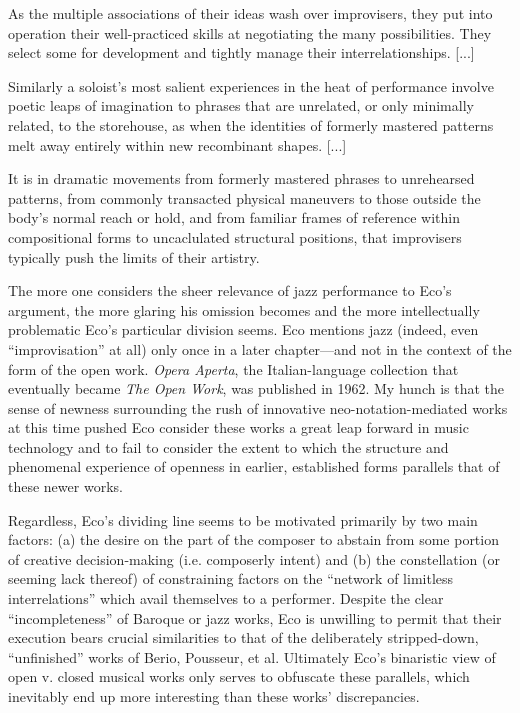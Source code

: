         \begin{smallquote}
            As the multiple associations of their ideas wash over improvisers, they put into operation their well-practiced skills at negotiating the many possibilities. They select some for development and tightly manage their interrelationships. [...]

                \vspace{5pt}

            \noindent Similarly a soloist's most salient experiences in the heat of performance involve poetic leaps of imagination to phrases that are unrelated, or only minimally related, to the storehouse, as when the identities of formerly mastered patterns melt away entirely within new recombinant shapes. [...]

                \vspace{5pt}
            
            \noindent It is in dramatic movements from formerly mastered phrases to unrehearsed patterns, from commonly transacted physical maneuvers to those outside the body's normal reach or hold, and from familiar frames of reference within compositional forms to uncaclulated structural positions, that improvisers typically push the limits of their artistry.\autocite[216--7]{Berliner_1994}
        \end{smallquote}

    The more one considers the sheer relevance of jazz performance to Eco's argument, the more glaring his omission becomes and the more intellectually problematic Eco's particular division seems. Eco mentions jazz (indeed, even ``improvisation'' at all) only once in a later chapter---and not in the context of the form of the open work.\autocite[109]{Eco_Robey_1989} \textit{Opera Aperta}, the Italian-language collection that eventually became \textit{The Open Work}, was published in 1962. My hunch is that the sense of newness surrounding the rush of innovative neo-notation-mediated works at this time pushed Eco consider these works a great leap forward in music technology and to fail to consider the extent to which the structure and phenomenal experience of openness in earlier, established forms parallels that of these newer works. 
    
    Regardless, Eco's dividing line seems to be motivated primarily by two main factors: (a) the desire on the part of the composer to abstain from some portion of creative decision-making (i.e. composerly intent) and (b) the constellation (or seeming lack thereof) of constraining factors on the ``network of limitless interrelations'' which avail themselves to a performer. Despite the clear ``incompleteness'' of Baroque or jazz works, Eco is unwilling to permit that their execution bears crucial similarities to that of the deliberately stripped-down, ``unfinished'' works of Berio, Pousseur, et al. Ultimately Eco's binaristic view of open v. closed musical works only serves to obfuscate these parallels, which inevitably end up more interesting than these works' discrepancies.
    
